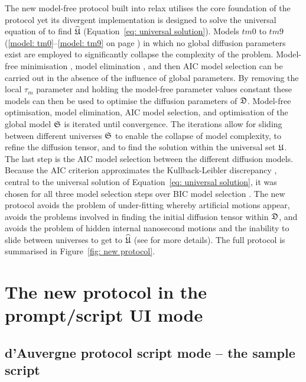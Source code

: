 \begin{htmlonly}
\begin{htmlonly}
The new model-free protocol built into relax utilises the core foundation of the \citet{Butterwick04} protocol yet its divergent implementation is designed to solve the universal equation of \citet{dAuvergneGooley07} to find $\widehat{\mathfrak{U}}$ (Equation~\ref{eq: universal solution}).  Models $tm0$ to $tm9$ (\ref{model: tm0}--\ref{model: tm9} on page \pageref{model: tm0}) in which no global diffusion parameters exist are employed to significantly collapse the complexity of the problem.  Model-free minimisation \citep{dAuvergneGooley08a}, model elimination \citep{dAuvergneGooley06}, and then AIC model selection \citep{Akaike73, dAuvergneGooley03} can be carried out in the absence of the influence of global parameters.  By removing the local $\tau_m$ parameter and holding the model-free parameter values constant these models can then be used to optimise the diffusion parameters of $\mathfrak{D}$.  Model-free optimisation, model elimination, AIC model selection, and optimisation of the global model $\mathfrak{S}$ is iterated until convergence.  The iterations allow for sliding between different universes $\mathfrak{S}$ to enable the collapse of model complexity, to refine the diffusion tensor, and to find the solution within the universal set $\mathfrak{U}$.  The last step is the AIC model selection between the different diffusion models.  Because the AIC criterion approximates the Kullback-Leibler discrepancy \citep{KullbackLeibler51}, central to the universal solution of Equation~\eqref{eq: universal solution}, it was chosen for all three model selection steps over BIC model selection \citep{Schwarz78, dAuvergneGooley03, Chen04}.  The new protocol avoids the problem of under-fitting whereby artificial motions appear, avoids the problems involved in finding the initial diffusion tensor within $\mathfrak{D}$, and avoids the problem of hidden internal nanosecond motions and the inability to slide between universes to get to $\widehat{\mathfrak{U}}$ (see \citet{dAuvergneGooley07} for more details).  The full protocol is summarised in Figure~\ref{fig: new protocol}.



\newpage
\section{The new protocol in the prompt/script UI mode}



\subsection{d'Auvergne protocol script mode -- the sample script}


\end{htmlonly}
\end{htmlonly}
